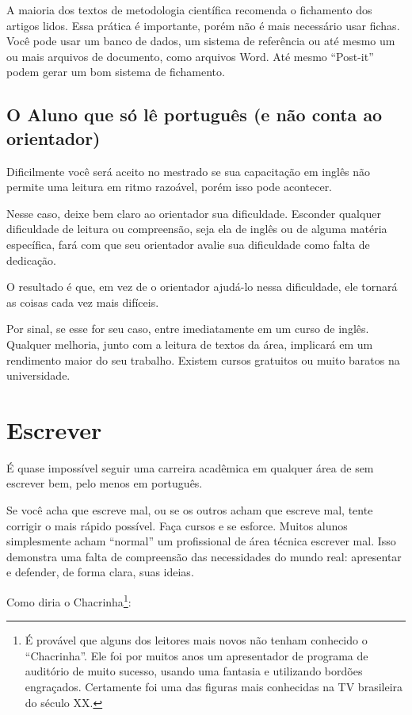 A maioria dos textos de metodologia científica recomenda o fichamento dos artigos lidos. Essa prática é importante, porém não é mais necessário usar fichas. Você pode usar um banco de dados, um sistema de referência ou até mesmo um ou mais arquivos de documento, como arquivos Word. Até mesmo “Post-it” podem gerar um bom sistema de fichamento. 


\subsection{O Aluno que só lê português (e não conta ao orientador)}


Dificilmente você será aceito no mestrado se sua capacitação em inglês não permite uma leitura em ritmo razoável, porém isso pode acontecer.


Nesse caso, deixe bem claro ao orientador sua dificuldade. Esconder qualquer dificuldade de leitura ou compreensão, seja ela de inglês ou de alguma matéria específica, fará com que seu orientador avalie sua dificuldade como falta de dedicação.


O resultado é que, em vez de o orientador ajudá-lo nessa dificuldade, ele tornará as coisas cada vez mais difíceis.


Por sinal, se esse for seu caso, entre imediatamente em um curso de inglês. Qualquer melhoria, junto com a leitura de textos da área, implicará em um rendimento maior do seu trabalho. Existem cursos gratuitos ou muito baratos na universidade.


\section{Escrever}


É quase impossível seguir uma carreira acadêmica em qualquer área de sem escrever bem, pelo menos em português. 


Se você acha que escreve mal, ou se os outros acham que escreve mal, tente corrigir o mais rápido possível. Faça cursos e se esforce. Muitos alunos simplesmente acham “normal” um profissional de área técnica escrever mal. Isso demonstra uma falta de compreensão das necessidades do mundo real: apresentar e defender, de forma clara, suas ideias. 


Como diria o Chacrinha\footnote{É provável que alguns dos leitores mais novos não tenham conhecido o “Chacrinha”. Ele foi por muitos anos um apresentador de programa de auditório de muito sucesso, usando uma fantasia e utilizando bordões engraçados. Certamente foi uma das figuras mais conhecidas na TV brasileira do século XX.}: 


